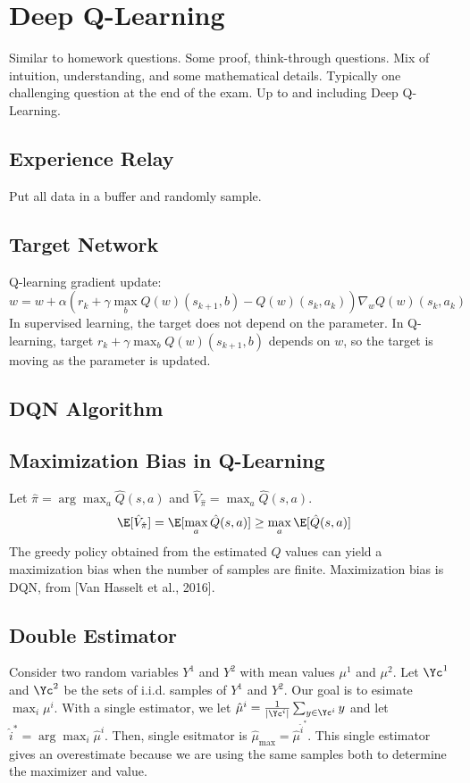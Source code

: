 \chapter{Deep Q-Learning}
Similar to homework questions. Some proof, think-through questions. Mix of intuition, understanding,
and some mathematical details. Typically one challenging question at the end of the exam. Up to and including Deep Q-Learning.

\section{Experience Relay}
Put all data in a buffer and randomly sample.

\section{Target Network}
Q-learning gradient update:
\[
  w = w + \alpha(r_k + \gamma \max_{b} Q(w)(s_{k+1}, b) - Q(w)(s_k, a_k)) \nabla_{w} Q(w)(s_k, a_k)
\]
In supervised learning, the target does not depend on the parameter. In Q-learning, target $r_k + \gamma \max_{b} Q(w)(s_{k+1}, b)$ depends on $w$, so the target is moving as the parameter is updated.
\section{DQN Algorithm}
\section{Maximization Bias in Q-Learning}
Let $\hat{\pi} = \arg \max_{a} \hat{Q}(s,a)$ and $\hat{V}_{\hat{\pi}} = \max_{a} \hat{Q}(s,a)$.
\[
  \E[\hat{V}_{\hat{\pi}}] = \E[\max_{a} \hat{Q}(s,a)] \geq \max_{a} \E[\hat{Q}(s,a)]
\]
The greedy policy obtained from the estimated $Q$ values can yield a maximization bias when the number of samples are finite. Maximization bias is DQN, from [Van Hasselt et al., 2016].

\section{Double Estimator}
Consider two random variables $Y^1$ and $Y^2$ with mean values $\mu^1$ and $\mu^2$. Let $\Yc^1$ and $\Yc^2$ be the sets of i.i.d. samples of $Y^1$ and $Y^2$. Our goal is to esimate $\max_{i} \mu^i$. With a single estimator, we let $\hat{\mu}^i = \frac{1}{|\Yc^i|} \sum_{y\in\Yc^i} y$ and let $\hat{i}^* = \arg\max_{i} \hat{\mu}^i$. Then, single esitmator is $\hat{\mu}_\text{max} = \hat{\mu}^{\hat{i}^*}$. This single estimator gives an overestimate because we are using the same samples both to determine the maximizer and value. \\

